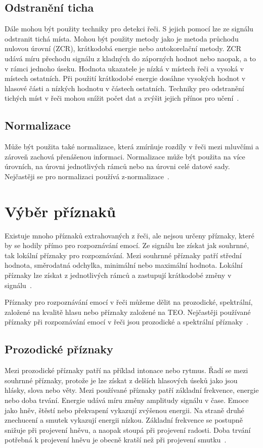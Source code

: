 \documentclass[FM,BP]{tulthesis}
\begin{document}
\section{Odstranění ticha} %
Dále mohou být použity techniky pro detekci řeči.
S jejich pomocí lze ze signálu odstranit tichá místa. Mohou být použity metody jako je metoda průchodu nulovou úrovní (ZCR), krátkodobá energie nebo autokorelační metody. ZCR udává míru přechodu signálu z kladných do záporných hodnot nebo naopak, a to v rámci jednoho úseku. Hodnota ukazatele je nízká v místech řeči a vysoká v místech ostatních. Při použití krátkodobé energie dosáhne vysokých hodnot v hlasové části a nízkých hodnotu v částech ostatních. Techniky pro odstranění tichých míst v řeči mohou snížit počet dat a zvýšit jejich přínos pro učení~\cite{DBLP:journals/speech/AkcayO20}.

\section{Normalizace} %
Může být použita také normalizace, která zmírňuje rozdíly v řeči mezi mluvčími a zároveň zachová přenášenou informaci. Normalizace může být použita na více úrovních, na úrovni jednotlivých rámců nebo na úrovni celé datové sady. Nejčastěji se pro normalizaci používá z-normalizace~\cite{DBLP:journals/speech/AkcayO20}.

\chapter{Výběr příznaků} %
Existuje mnoho příznaků extrahovaných z řeči, ale nejsou určeny příznaky, které by se hodily přímo pro rozpoznávání emocí. Ze signálu lze získat jak souhrnné, tak lokální příznaky pro rozpoznávání. Mezi souhrnné příznaky patří střední hodnota, směrodatná odchylka, minimální nebo maximální hodnota. Lokální příznaky lze získat z jednotlivých rámců a zastupují krátkodobé změny v signálu~\cite{DBLP:journals/speech/AkcayO20}.

Příznaky pro rozpoznávání emocí v řeči můžeme dělit na prozodické, spektrální, založené na kvalitě hlasu nebo příznaky založené na TEO. Nejčastěji používané příznaky při rozpoznávání emocí v řeči jsou prozodické a spektrální příznaky~\cite{DBLP:journals/speech/AkcayO20}.

\section{Prozodické příznaky}  %
Mezi prozodické příznaky patří na příklad intonace nebo rytmus. Řadí se mezi souhrnné příznaky, protože je lze získat z delších hlasových úseků jako jsou hlásky, slova nebo věty. Mezi používané příznaky patří základní frekvence, energie nebo doba trvání. Energie udává míru změny amplitudy signálu v čase. Emoce jako hněv, štěstí nebo překvapení vykazují zvýšenou energii. Na straně druhé znechucení a smutek vykazují energii nízkou. Základní frekvence se postupně snižuje při projevení hněvu, a naopak stoupá při projevení radosti. Doba trvání potřebná k projevení hněvu je obecně kratší než při projevení smutku~\cite{DBLP:journals/speech/AkcayO20}.
\end{document}
